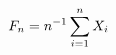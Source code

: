 \documentclass[preview]{standalone}
\begin{document}
\begin{align*}
\special{dvisvgm:raw <g id='unique000'>}F_n=n^{-1}\sum_{i=1}^nX_i\special{dvisvgm:raw </g>}
\end{align*}
\end{document}

